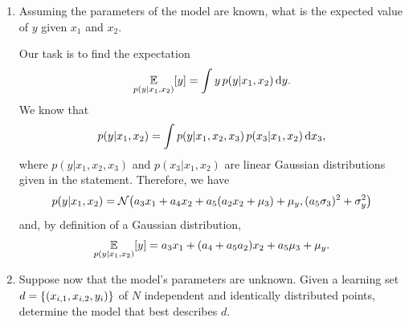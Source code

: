 \documentclass[11pt, a4paper]{article}
\begin{document}
\begin{enumerate}
    \item Assuming the parameters of the model are known, what is the expected value of $y$ given $x_1$ and $x_2$.

    \begin{solution}
        Our task is to find the expectation
        \begin{equation*}
            \underset{p(y | x_1, x_2)}{\mathbb{E}} [y] = \int y \, p(y | x_1, x_2) \operatorname{d}\!{y} .
        \end{equation*}
        We know that
        \begin{equation*}
            p(y | x_1, x_2) = \int p(y | x_1, x_2, x_3) \, p(x_3 | x_1, x_2) \operatorname{d}\!{x_3} ,
        \end{equation*}
        where $p(y | x_1, x_2, x_3)$ and $p(x_3 | x_1, x_2)$ are linear Gaussian distributions given in the statement. Therefore, we have
        \begin{equation*}
            p(y | x_1, x_2) = \N\rbk*{a_3 x_1 + a_4 x_2 + a_5 (a_2 x_2 + \mu_3) + \mu_y, (a_5 \sigma_3)^2 + \sigma_y^2}
        \end{equation*}
        and, by definition of a Gaussian distribution,
        \begin{equation*}
            \underset{p(y | x_1, x_2)}{\mathbb{E}} [y] = a_3 x_1 + (a_4 + a_5 a_2) x_2 + a_5 \mu_3 + \mu_y.
        \end{equation*}
    \end{solution}

    \item Suppose now that the model's parameters are unknown. Given a learning set $d = \{(x_{i,1}, x_{i,2}, y_i)\}$ of $N$ independent and identically distributed points, determine the model that best describes $d$.


\end{enumerate}
\end{document}
